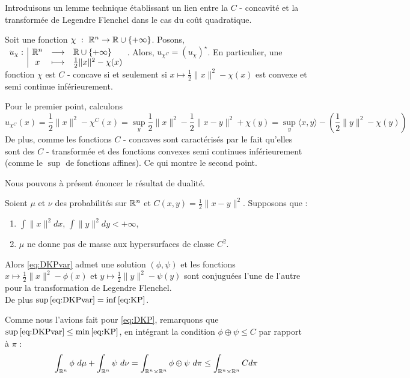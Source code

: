 \documentclass[a4paper,12pt]{article}
\begin{document}
\vspace{0.3cm}
Introduisons un lemme technique établissant un lien entre la $C$ - concavité et la transformée de Legendre Flenchel dans le cas du coût quadratique. 

\begin{lemme}
Soit une fonction $\chi\ :\ \mathbb{R}^n \rightarrow \mathbb{R}\cup\{+\infty\}$. Posons, $\begin{array}[t]{l|ccl} u_{\chi}: & \mathbb{R}^n & \longrightarrow & \mathbb{R}\cup\{+\infty\} \\ & x & \longmapsto & \frac{1}{2}\|x\|^2-\chi(x) \end{array} $. Alors, $u_{\chi^C} = (u_{\chi})^{\star}$. En particulier, une fonction $\chi$ est $C$ - concave si et seulement si $x\mapsto\frac{1}{2}\|x\|^2-\chi(x)$ est convexe et semi continue inférieurement. 
\end{lemme}
\begin{preuve}
Pour le premier point, calculons 
$$
u_{\chi^C}(x) =\frac{1}{2}\|x\|^2 - \chi^C(x)=\sup_y \frac{1}{2}\|x\|^2  - \frac{1}{2}\|x - y\|^2 + \chi(y) = \sup_y \langle x,y\rangle - \left( \frac{1}{2}\|y\|^2 - \chi(y)\right) 
$$
De plus, comme les fonctions $C$ - concaves sont caractérisés par le fait qu'elles sont des $C$ - transformée et des fonctions convexes semi continues inférieurement (comme le $\sup$ de fonctions affines). Ce qui montre le second point.
\end{preuve}
Nous pouvons à présent énoncer le résultat de dualité. 
\begin{theoreme}{}
Soient $\mu$ et $\nu$ des probabilités sur $\mathbb{R}^n$ et $C(x,y)=\frac{1}{2}\|x-y\|^2$. Supposons que : 
\begin{enumerate}
\item $\int\|x\|^2dx$, $\int\|y\|^2dy<+\infty$,
\item $\mu$ ne donne pas de masse aux hypersurfaces de classe $C^2$.
\end{enumerate}
Alors \eqref{eq:DKPvar} admet une solution $(\phi,\psi)$ et les fonctions $x\mapsto\frac{1}{2}\|x\|^2-\phi(x)$ et $y\mapsto\frac{1}{2}\|y\|^2-\psi(y)$ sont conjuguées l'une de l'autre pour la transformation de Legendre Flenchel.\\
De plus $\sup\eqref{eq:DKPvar}=\inf\eqref{eq:KP}$. 
\end{theoreme}
Comme nous l'avions fait pour \eqref{eq:DKP}, remarquons que $\sup\eqref{eq:DKPvar}\leq \min\eqref{eq:KP}$, en intégrant la condition $\phi\oplus\psi\leq C$ par rapport à $\pi$ : 
$$
\int_{\mathbb{R}^n}\phi\ d\mu + \int_{\mathbb{R}^n}\psi\ d\nu = \int_{\mathbb{R}^n\times\mathbb{R}^n} \phi\oplus\psi\ d\pi \leq\int_{\mathbb{R}^n\times\mathbb{R}^n} C d\pi 
$$
\end{document}
